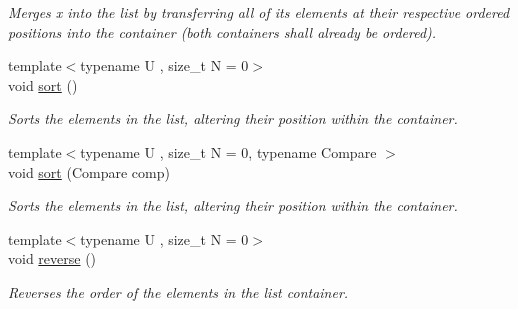 \begin{DoxyCompactItemize}
\begin{DoxyCompactList}\small\item\em Merges x into the list by transferring all of its elements at their respective ordered positions into the container (both containers shall already be ordered). \end{DoxyCompactList}\item 
\hypertarget{classheterogeneous_1_1heterolist_3_01_t_00_01_types_8_8_8_4_a4265cdb3aa6c0e69382beedf844daca8}{}{\footnotesize template$<$typename U , size\+\_\+t N = 0$>$ }\\void \hyperlink{classheterogeneous_1_1heterolist_3_01_t_00_01_types_8_8_8_4_a4265cdb3aa6c0e69382beedf844daca8}{sort} ()\label{classheterogeneous_1_1heterolist_3_01_t_00_01_types_8_8_8_4_a4265cdb3aa6c0e69382beedf844daca8}

\begin{DoxyCompactList}\small\item\em Sorts the elements in the list, altering their position within the container. \end{DoxyCompactList}\item 
\hypertarget{classheterogeneous_1_1heterolist_3_01_t_00_01_types_8_8_8_4_a17cc169665b22ef1d3324ef5da5bda7e}{}{\footnotesize template$<$typename U , size\+\_\+t N = 0, typename Compare $>$ }\\void \hyperlink{classheterogeneous_1_1heterolist_3_01_t_00_01_types_8_8_8_4_a17cc169665b22ef1d3324ef5da5bda7e}{sort} (Compare comp)\label{classheterogeneous_1_1heterolist_3_01_t_00_01_types_8_8_8_4_a17cc169665b22ef1d3324ef5da5bda7e}

\begin{DoxyCompactList}\small\item\em Sorts the elements in the list, altering their position within the container. \end{DoxyCompactList}\item 
\hypertarget{classheterogeneous_1_1heterolist_3_01_t_00_01_types_8_8_8_4_a03defee457462e8efdbdfe91eacdb4e9}{}{\footnotesize template$<$typename U , size\+\_\+t N = 0$>$ }\\void \hyperlink{classheterogeneous_1_1heterolist_3_01_t_00_01_types_8_8_8_4_a03defee457462e8efdbdfe91eacdb4e9}{reverse} ()\label{classheterogeneous_1_1heterolist_3_01_t_00_01_types_8_8_8_4_a03defee457462e8efdbdfe91eacdb4e9}

\begin{DoxyCompactList}\small\item\em Reverses the order of the elements in the list container. \end{DoxyCompactList}\end{DoxyCompactItemize}
